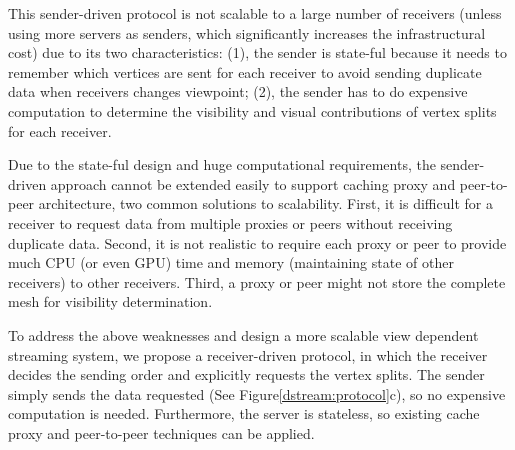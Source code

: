     This sender-driven protocol is not scalable to a large number 
    of receivers (unless using more servers as senders, 
    which significantly increases the infrastructural cost) 
    due to its two characteristics:
    (1), the sender is state-ful because it needs to remember which
    vertices are sent for each receiver to avoid sending duplicate data
    when receivers changes viewpoint;
    (2), the sender has to do expensive computation to determine the 
    visibility and visual contributions of vertex splits for each receiver.
    
    Due to the state-ful design and huge computational requirements,
    the sender-driven approach cannot be extended easily to support 
    caching proxy and peer-to-peer architecture, two common solutions to scalability. 
    First, it is difficult for a receiver to request data from multiple proxies or peers
    without receiving duplicate data.
    Second, it is not realistic to require each proxy or peer to provide much CPU (or even GPU) time
    and memory (maintaining state of other receivers) to other receivers. 
    Third, a proxy or peer might not store the complete mesh for visibility determination.

    To address the above weaknesses and design a more scalable view dependent streaming system, 
    we propose a receiver-driven protocol, 
    in which the receiver decides the sending order and explicitly requests
    the vertex splits. The sender simply sends the data requested 
    (See Figure\ref{dstream:protocol}c), so no expensive computation is needed.
    Furthermore, the server is stateless, so
    existing cache proxy and peer-to-peer techniques can be applied.

    \begin{comment}
    The receiver-driven protocol also reduces the size of data sent by the sender.
    In sender-driven protocols, for each vertex split, the sender has to send identifications
    to indicate which vertex to be split ($V_s$ in Figure \ref{f:intro:split2}),
    requiring at least $log_2{n}$ bits if $n$ vertices exist \cite{258843}. 
    In the receiver-driven protocol, however, the sender needs not send
    these identifications since the vertex splits can be sent according to
    the requesting order from the receiver. The identifications, sent
    by the receiver, consumes the down-link bandwidth 
    of the sender, which is often less likely to be the bottleneck than the up-link.
    \end{comment}

